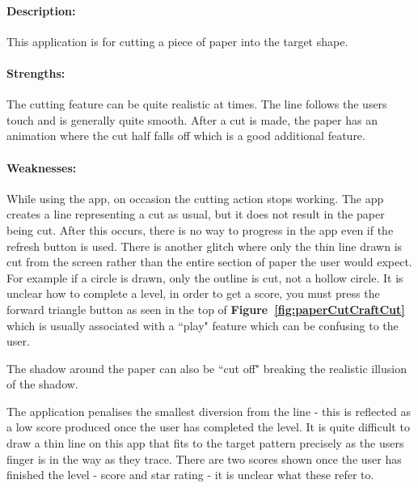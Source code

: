 \documentclass[11pt]{article}
\begin{document}
                \paragraph{Description:} This application is for cutting a piece of paper into the target shape. 
                
                \paragraph{Strengths:}
                The cutting feature can be quite realistic at times. The line follows the users touch and is generally quite smooth. After a cut is made, the paper has an animation where the cut half falls off which is a good additional feature.
                
                \paragraph{Weaknesses:}
                While using the app, on occasion the cutting action stops working. The app creates a line representing a cut as usual, but it does not result in the paper being cut. After this occurs, there is no way to progress in the app even if the refresh button is used. There is another glitch where only the thin line drawn is cut from the screen rather than the entire section of paper the user would expect. For example if a circle is drawn, only the outline is cut, not a hollow circle. 
                It is unclear how to complete a level, in order to get a score, you must press the forward triangle button as seen in the top of \textbf{Figure~\ref{fig:paperCutCraftCut}} which is usually associated with a ``play" feature which can be confusing to the user. 
                
                The shadow around the paper can also be ``cut off" breaking the realistic illusion of the shadow.
                
                The application penalises the smallest diversion from the line - this is reflected as a low score produced once the user has completed the level. It is quite difficult to draw a thin line on this app that fits to the target pattern precisely as the users finger is in the way as they trace. There are two scores shown once the user has finished the level - score and star rating - it is unclear what these refer to. 
                
\end{document}

